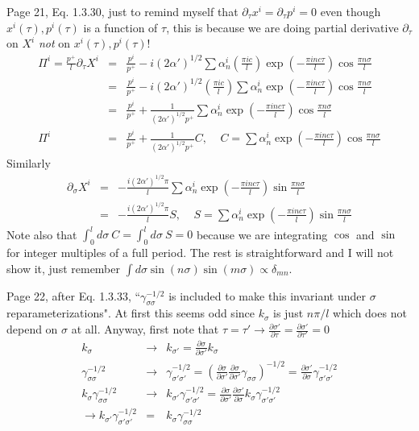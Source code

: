 \documentclass[aps,preprint,preprintnumbers,nofootinbib,showpacs,prd]{revtex4-1}
\newcommand{\nbea}{\begin{eqnarray*}}
\newcommand{\neea}{\end{eqnarray*}}
\begin{document}
Page 21, Eq. 1.3.30, just to remind myself that $\partial_\tau x^i = \partial_\tau p^i = 0$ even though $x^i(\tau), p^i(\tau)$ is a function of $\tau$, this is because we are doing partial derivative $\partial_\tau$ on $X^i$ {\it not} on $x^i(\tau), p^i(\tau)$!
%
\nbea
\Pi^i = \frac{p^+}{l}\partial_\tau X^i & = & \frac{p^i}{p^+} - i(2 \alpha')^{1/2} \sum \alpha^i_n \left ( \frac{\pi i c}{l} \right ) \exp \left ( -\frac{\pi i nc \tau}{l} \right ) \cos \frac{\pi n \sigma}{l} \\
& = & \frac{p^i}{p^+} - i(2 \alpha')^{1/2} \left ( \frac{\pi i c}{l} \right ) \sum \alpha^i_n \exp \left ( -\frac{\pi i nc \tau}{l} \right ) \cos \frac{\pi n \sigma}{l} \\
& = & \frac{p^i}{p^+} + \frac{1}{(2 \alpha')^{1/2} p^+} \sum \alpha^i_n \exp \left ( -\frac{\pi i nc \tau}{l} \right ) \cos \frac{\pi n \sigma}{l} \\
\Pi^i & = & \frac{p^i}{p^+} + \frac{1}{(2 \alpha')^{1/2} p^+} C, ~~~~~ C =  \sum \alpha^i_n \exp \left ( -\frac{\pi i nc \tau}{l} \right ) \cos \frac{\pi n \sigma}{l}
\neea
%
Similarly
%
\nbea
\partial_\sigma X^i & = & - \frac { i(2 \alpha')^{1/2} \pi}{l} \sum \alpha^i_n \exp \left ( -\frac{\pi i nc \tau}{l} \right ) \sin \frac{\pi n \sigma}{l} \\
& = & - \frac { i(2 \alpha')^{1/2} \pi}{l} S, ~~~~~ S = \sum \alpha^i_n \exp \left ( -\frac{\pi i nc \tau}{l} \right ) \sin \frac{\pi n \sigma}{l}
\neea
%
Note also that $\int_0^l d\sigma~ C = \int_0^l d\sigma~ S = 0$ because we are integrating $\cos$ and $\sin$ for integer multiples of a full period. The rest is straightforward and I will not show it, just remember $\int d\sigma \sin(n\sigma) \sin(m\sigma) \propto \delta_{mn}$.

Page 22, after Eq. 1.3.33, ``$\gamma^{-1/2}_{\sigma\sigma}$ is included to make this invariant under $\sigma$ reparameterizations". At first this seems odd since $k_\sigma$ is just $n\pi/l$ which does not depend on $\sigma$ at all. Anyway, first note that $\tau = \tau' \rightarrow \frac{\partial \sigma'}{\partial \tau} = \frac{\partial \sigma'}{\partial \tau'} = 0$
%
\nbea
k_\sigma & \rightarrow & k_{\sigma'} = \frac{\partial \sigma}{\partial \sigma'} k_\sigma \\
\gamma^{-1/2}_{\sigma\sigma} & \rightarrow & \gamma^{-1/2}_{\sigma'\sigma'}  = \left ( \frac{\partial \sigma}{\partial \sigma'} \frac{\partial \sigma}{\partial \sigma'} \gamma_{\sigma\sigma} \right )^{-1/2} = \frac{\partial \sigma'}{\partial \sigma} \gamma_{\sigma'\sigma'}^{-1/2} \\
k_\sigma \gamma^{-1/2}_{\sigma\sigma} & \rightarrow & k_{\sigma'} \gamma^{-1/2}_{\sigma'\sigma'} = \frac{\partial \sigma}{\partial \sigma'} \frac{\partial \sigma'}{\partial \sigma} k_\sigma \gamma_{\sigma'\sigma'}^{-1/2} \\
\rightarrow k_{\sigma'} \gamma^{-1/2}_{\sigma'\sigma'}  & = & k_\sigma \gamma^{-1/2}_{\sigma\sigma}
\neea
%
\end{document}
